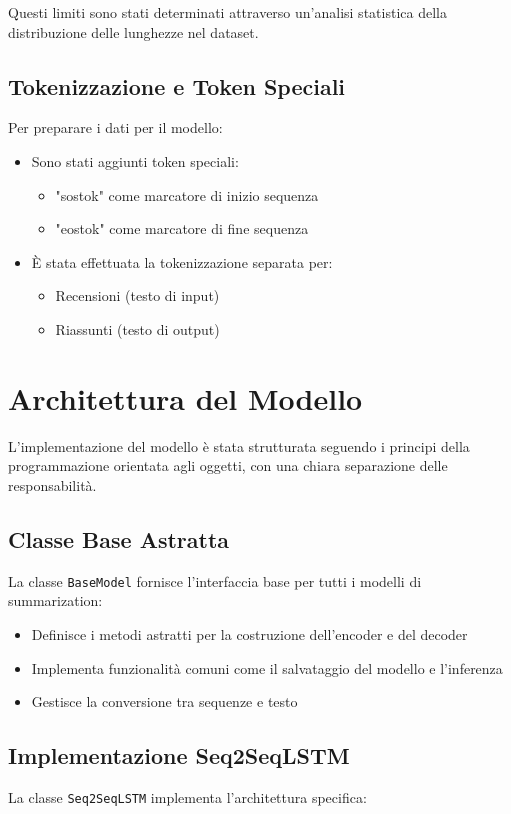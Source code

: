 \documentclass[a4paper, 12pt]{article}
\begin{document}
Questi limiti sono stati determinati attraverso un'analisi statistica della distribuzione delle lunghezze nel dataset.

\subsection{Tokenizzazione e Token Speciali}
Per preparare i dati per il modello:
\begin{itemize}
    \item Sono stati aggiunti token speciali:
        \begin{itemize}
            \item "sostok" come marcatore di inizio sequenza
            \item "eostok" come marcatore di fine sequenza
        \end{itemize}
    \item È stata effettuata la tokenizzazione separata per:
        \begin{itemize}
            \item Recensioni (testo di input)
            \item Riassunti (testo di output)
        \end{itemize}
\end{itemize}

\section{Architettura del Modello}
L'implementazione del modello è stata strutturata seguendo i principi della programmazione orientata agli oggetti, con una chiara separazione delle responsabilità.

\subsection{Classe Base Astratta}
La classe \texttt{BaseModel} fornisce l'interfaccia base per tutti i modelli di summarization:
\begin{itemize}
    \item Definisce i metodi astratti per la costruzione dell'encoder e del decoder
    \item Implementa funzionalità comuni come il salvataggio del modello e l'inferenza
    \item Gestisce la conversione tra sequenze e testo
\end{itemize}

\subsection{Implementazione Seq2SeqLSTM}
La classe \texttt{Seq2SeqLSTM} implementa l'architettura specifica:
\end{document}
